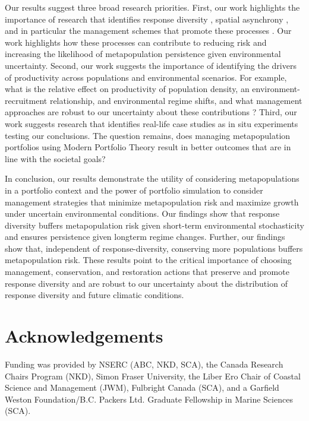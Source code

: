Our results suggest three broad research priorities. First, our work highlights the importance of research that identifies response diversity \citep[e.g.][]{eliason2011}, spatial asynchrony \citep[e.g.][]{thorson2013}, and in particular the management schemes that promote these processes \citep{moore2010}. Our work highlights how these processes can contribute to reducing risk and increasing the likelihood of metapopulation persistence given environmental uncertainty. Second, our work suggests the importance of identifying the drivers of productivity across populations and environmental scenarios. For example, what is the relative effect on productivity of population density, an environment-recruitment relationship, and environmental regime shifts, and what management approaches are robust to our uncertainty about these contributions \citep{vert-pre2013}? Third, our work suggests research that identifies real-life case studies as in situ experiments testing our conclusions. The question remains, does managing metapopulation portfolios using Modern Portfolio Theory result in better outcomes that are in line with the societal goals?

In conclusion, our results demonstrate the utility of considering metapopulations in a portfolio context and the power of portfolio simulation to consider management strategies that minimize metapopulation risk and maximize growth under uncertain environmental conditions. Our findings show that response diversity buffers metapopulation risk given short-term environmental stochasticity and ensures persistence given longterm regime changes. Further, our findings show that, independent of response-diversity, conserving more populations buffers metapopulation risk. These results point to the critical importance of choosing management, conservation, and restoration actions that preserve and promote response diversity and are robust to our uncertainty about the distribution of response diversity and future climatic conditions.

\section{Acknowledgements}

Funding was provided by NSERC (ABC, NKD, SCA), the Canada Research Chairs Program (NKD), Simon Fraser University, the Liber Ero Chair of Coastal Science and Management (JWM), Fulbright Canada (SCA), and a Garfield Weston Foundation/B.C. Packers Ltd. Graduate Fellowship in Marine Sciences (SCA).

